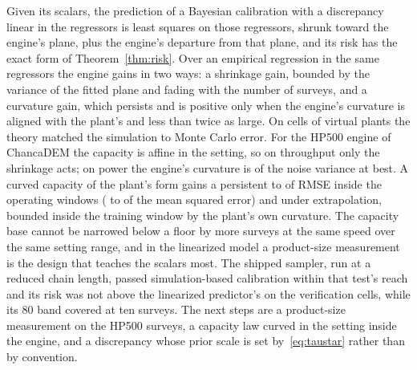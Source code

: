 Given its scalars, the prediction of a Bayesian calibration with a discrepancy linear in the regressors is least squares on
those regressors, shrunk toward the engine's plane, plus the engine's departure from that plane, and its risk has the exact form
of Theorem~\ref{thm:risk}. Over an empirical regression in the same regressors the engine gains in two ways: a shrinkage gain,
bounded by the variance of the fitted plane and fading with the number of surveys, and a curvature gain, which persists and is
positive only when the engine's curvature is aligned with the plant's and less than twice as large. On \cellsTotal{} cells of
virtual plants the theory matched the simulation to Monte Carlo error. For the HP500 engine of ChancaDEM the capacity is affine in
the setting, so on throughput only the shrinkage acts; on power the engine's curvature is \curvShareKw\pct{} of the noise
variance at best. A curved capacity of the plant's form gains a persistent \capRoRmseS{} to \capRoRmseW\pct{} of RMSE inside the
operating windows (\capRoMseS{} to \capRoMseW\pct{} of the mean squared error) and \capRoRmseX\pct{} under extrapolation, bounded
inside the training window by the plant's own curvature. The capacity base cannot be narrowed below a floor by more surveys at
the same speed over the same setting range, and in the linearized model a product-size measurement is the design that teaches
the scalars most. The shipped sampler, run at a reduced chain length, passed simulation-based calibration within that
test's reach and its risk was not above the linearized predictor's on the verification cells, while its 80\pct{} band covered \verCovPooled{} at ten surveys. The next steps are a product-size
measurement on the HP500 surveys, a capacity law curved in the setting inside the engine, and a discrepancy whose prior scale is
set by~\eqref{eq:taustar} rather than by convention.
